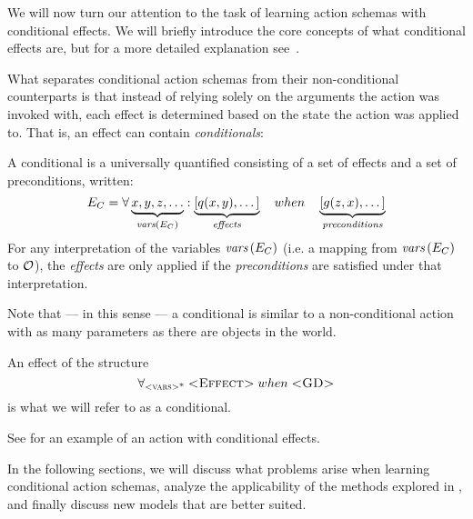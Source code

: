 \documentclass[../Master.tex]{subfiles}
\begin{document}
We will now turn our attention to the task of learning action schemas with conditional effects. 
We will briefly introduce the core concepts of what conditional effects are, but for a more detailed explanation see~. 

What separates conditional action schemas from their non-conditional counterparts is that instead of relying solely on the arguments the action was invoked with, each effect is determined based on the state the action was applied to. That is, an effect can contain \emph{conditionals}:
\begin{definition}[Conditional]
    A conditional is a universally quantified consisting of a set of effects and a set of preconditions, written:
\begin{equation*}
    E_C = \forall \underbrace{x, y, z, \dots}_{\textit{vars} \left(E_C\right)} : 
    \underbrace{\left[ q(x, y), \dots \right]}_{\textit{effects}} \quad when \quad 
    \underbrace{\left[ g(z, x), \dots  \right]}_{\textit{preconditions}}
\end{equation*}
For any interpretation of the variables $\textit{vars}\left(E_C\right)$ (i.e. a mapping from $\textit{vars}\left(E_C\right)$ to $\mathcal{O}$), the \textit{effects} are only applied if the \textit{preconditions} are satisfied under that interpretation. 
\end{definition}
Note that --- in this sense --- a conditional is similar to a non-conditional action with as many parameters as there are objects in the world. 

\begin{definition}[Conditional]
	An effect of the structure 
	\begin{equation}
		\forall_{\textsc{<vars>*}} \; \textsc{<Effect>} \; when \; \textsc{<GD>}
	\end{equation} is what we will refer to as a conditional.
\end{definition}


See  for an example of an action with conditional effects. 

In the following sections, we will discuss what problems arise when learning conditional action schemas, analyze the applicability of the methods explored in , and finally discuss new models that are better suited.
\end{document}
